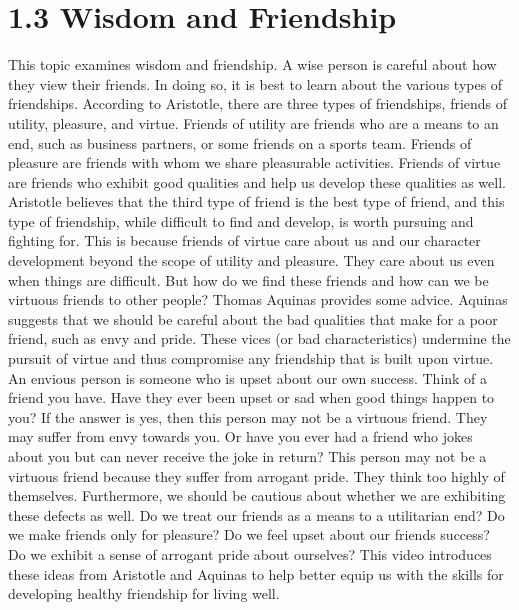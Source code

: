 \documentclass[
]{book}
\begin{document}
\hypertarget{wisdom-and-friendship}{%
\section*{1.3 Wisdom and Friendship}\label{wisdom-and-friendship}}

This topic examines wisdom and friendship. A wise person is careful about how they view their friends. In doing so, it is best to learn about the various types of friendships. According to Aristotle, there are three types of friendships, friends of utility, pleasure, and virtue. Friends of utility are friends who are a means to an end, such as business partners, or some friends on a sports team. Friends of pleasure are friends with whom we share pleasurable activities. Friends of virtue are friends who exhibit good qualities and help us develop these qualities as well. Aristotle believes that the third type of friend is the best type of friend, and this type of friendship, while difficult to find and develop, is worth pursuing and fighting for. This is because friends of virtue care about us and our character development beyond the scope of utility and pleasure. They care about us even when things are difficult. But how do we find these friends and how can we be virtuous friends to other people? Thomas Aquinas provides some advice. Aquinas suggests that we should be careful about the bad qualities that make for a poor friend, such as envy and pride. These vices (or bad characteristics) undermine the pursuit of virtue and thus compromise any friendship that is built upon virtue. An envious person is someone who is upset about our own success. Think of a friend you have. Have they ever been upset or sad when good things happen to you? If the answer is yes, then this person may not be a virtuous friend. They may suffer from envy towards you. Or have you ever had a friend who jokes about you but can never receive the joke in return? This person may not be a virtuous friend because they suffer from arrogant pride. They think too highly of themselves. Furthermore, we should be cautious about whether we are exhibiting these defects as well. Do we treat our friends as a means to a utilitarian end? Do we make friends only for pleasure? Do we feel upset about our friends success? Do we exhibit a sense of arrogant pride about ourselves? This video introduces these ideas from Aristotle and Aquinas to help better equip us with the skills for developing healthy friendship for living well.
\end{document}
